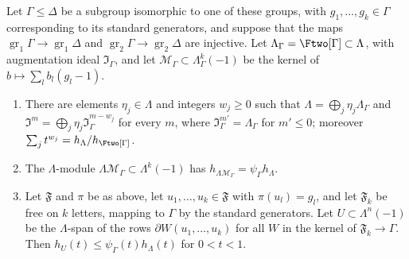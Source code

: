 \begin{lemma}\label{tw:filtered-local-freeness}
Let $\Gamma\le\Delta$ be a subgroup isomorphic to one of these groups, with
$g_1,\dots,g_k\in\Gamma$ corresponding to its standard generators, and
suppose that the maps $\operatorname{gr}_1\Gamma\to\operatorname{gr}_1\Delta$
and $\operatorname{gr}_2\Gamma\to\operatorname{gr}_2\Delta$ are injective. Let $\Lambda_\Gamma=\Ftwo[\Gamma]\subset\Lambda$, with
augmentation ideal $\mathfrak I_\Gamma$, and let
$\mathcal M_\Gamma\subset\Lambda_\Gamma^k(-1)$ be the kernel of
$b\mapsto\sum_lb_l(g_l-1)$.
\begin{enumerate}
\item[(a)] There are elements $\eta_j\in\Lambda$ and integers $w_j\ge0$ such
 that $\Lambda=\bigoplus_j\eta_j\Lambda_\Gamma$ and
 $\mathfrak I^m=\bigoplus_j\eta_j\mathfrak I_\Gamma^{m-w_j}$ for every $m$,
 where $\mathfrak I_\Gamma^{m'}=\Lambda_\Gamma$ for $m'\le0$; moreover
 $\sum_jt^{w_j}=h_\Lambda/h_{\Ftwo[\Gamma]}$.
\item[(b)] The $\Lambda$-module $\Lambda\mathcal M_\Gamma\subset\Lambda^k(-1)$
 has $h_{\Lambda\mathcal M_\Gamma}=\psi_\Gamma h_\Lambda$.
\item[(c)] Let $\mathfrak F$ and $\pi$ be as above, let
 $u_1,\dots,u_k\in\mathfrak F$ with $\pi(u_l)=g_l$, and let $\mathfrak F_k$ be
 free on $k$ letters, mapping to $\Gamma$ by the standard generators. Let
 $U\subset\Lambda^n(-1)$ be the $\Lambda$-span of the rows
 $\partial W(u_1,\dots,u_k)$ for all $W$ in the kernel of
 $\mathfrak F_k\to\Gamma$. Then $h_U(t)\le\psi_\Gamma(t)h_\Lambda(t)$ for
 $0<t<1$.
\end{enumerate}
\end{lemma}

